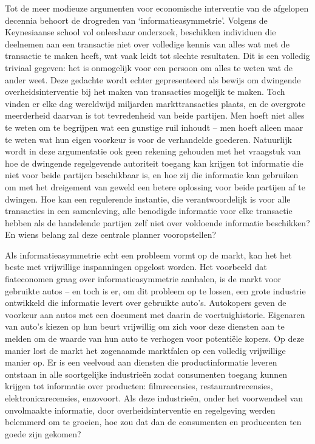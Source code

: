 \documentclass[
  a5paper,
  smalldemyvopaper,11pt,twoside,onecolumn,openright,extrafontsizes,
hidelinks]{memoir}
\begin{document}
Tot de meer modieuze argumenten voor economische interventie van de
afgelopen decennia behoort de drogreden van `informatieasymmetrie'.
Volgens de Keynesiaanse school vol onleesbaar onderzoek, beschikken
individuen die deelnemen aan een transactie niet over volledige kennis
van alles wat met de transactie te maken heeft, wat vaak leidt tot
slechte resultaten. Dit is een volledig triviaal gegeven: het is
onmogelijk voor een persoon om alles te weten wat de ander weet. Deze
gedachte wordt echter gepresenteerd als bewijs om dwingende
overheidsinterventie bij het maken van transacties mogelijk te maken.
Toch vinden er elke dag wereldwijd miljarden markttransacties plaats, en
de overgrote meerderheid daarvan is tot tevredenheid van beide partijen.
Men hoeft niet alles te weten om te begrijpen wat een gunstige ruil
inhoudt -- men hoeft alleen maar te weten wat hun eigen voorkeur is voor
de verhandelde goederen. Natuurlijk wordt in deze argumentatie ook geen
rekening gehouden met het vraagstuk van hoe de dwingende regelgevende
autoriteit toegang kan krijgen tot informatie die niet voor beide
partijen beschikbaar is, en hoe zij die informatie kan gebruiken om met
het dreigement van geweld een betere oplossing voor beide partijen af te
dwingen. Hoe kan een regulerende instantie, die verantwoordelijk is voor
alle transacties in een samenleving, alle benodigde informatie voor elke
transactie hebben als de handelende partijen zelf niet over voldoende
informatie beschikken? En wiens belang zal deze centrale planner
vooropstellen?

Als informatieasymmetrie echt een probleem vormt op de markt, kan het
het beste met vrijwillige inspanningen opgelost worden. Het voorbeeld
dat fiateconomen graag over informatieasymmetrie aanhalen, is de markt
voor gebruikte autos -- en toch is er, om dit probleem op te lossen, een
grote industrie ontwikkeld die informatie levert over gebruikte auto's.
Autokopers geven de voorkeur aan autos met een document met daarin de
voertuighistorie. Eigenaren van auto's kiezen op hun beurt vrijwillig om
zich voor deze diensten aan te melden om de waarde van hun auto te
verhogen voor potentiële kopers. Op deze manier lost de markt het
zogenaamde marktfalen op een volledig vrijwillige manier op. Er is een
veelvoud aan diensten die productinformatie leveren ontstaan in alle
soortgelijke industrieën zodat consumenten toegang kunnen krijgen tot
informatie over producten: filmrecensies, restaurantrecensies,
elektronicarecensies, enzovoort. Als deze industrieën, onder het
voorwendsel van onvolmaakte informatie, door overheidsinterventie en
regelgeving werden belemmerd om te groeien, hoe zou dat dan de
consumenten en producenten ten goede zijn gekomen?
\end{document}
